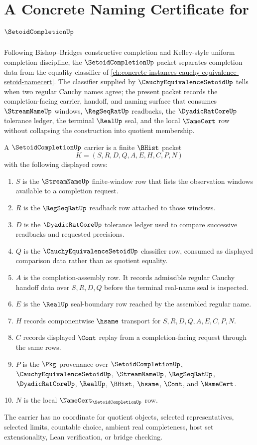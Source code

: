 \chapter{A Concrete Naming Certificate for $\SetoidCompletionUp$}
\label{ch:concrete-instances-setoid-completion-namecert}

Following Bishop--Bridges constructive completion and Kelley-style uniform completion discipline, the $\SetoidCompletionUp$ packet separates completion data from the equality classifier of \autoref{ch:concrete-instances-cauchy-equivalence-setoid-namecert}. The classifier supplied by $\CauchyEquivalenceSetoidUp$ tells when two regular Cauchy names agree; the present packet records the completion-facing carrier, handoff, and naming surface that consumes $\StreamNameUp$ windows, $\RegSeqRatUp$ readbacks, the $\DyadicRatCoreUp$ tolerance ledger, the terminal $\RealUp$ seal, and the local $\NameCert$ row without collapsing the construction into quotient membership.

\begin{definition}
\label{def:setoid-completion-carrier}
A $\SetoidCompletionUp$ carrier is a finite $\BHist$ packet
$$
K=(S,R,D,Q,A,E,H,C,P,N)
$$
with the following displayed rows:
\begin{enumerate}
\item $S$ is the $\StreamNameUp$ finite-window row that lists the observation windows available to a completion request.
\item $R$ is the $\RegSeqRatUp$ readback row attached to those windows.
\item $D$ is the $\DyadicRatCoreUp$ tolerance ledger used to compare successive readbacks and requested precisions.
\item $Q$ is the $\CauchyEquivalenceSetoidUp$ classifier row, consumed as displayed comparison data rather than as quotient equality.
\item $A$ is the completion-assembly row. It records admissible regular Cauchy handoff data over $S,R,D,Q$ before the terminal real-name seal is inspected.
\item $E$ is the $\RealUp$ seal-boundary row reached by the assembled regular name.
\item $H$ records componentwise $\hsame$ transport for $S,R,D,Q,A,E,C,P,N$.
\item $C$ records displayed $\Cont$ replay from a completion-facing request through the same rows.
\item $P$ is the $\Pkg$ provenance over $\SetoidCompletionUp$, $\CauchyEquivalenceSetoidUp$, $\StreamNameUp$, $\RegSeqRatUp$, $\DyadicRatCoreUp$, $\RealUp$, $\BHist$, $\hsame$, $\Cont$, and $\NameCert$.
\item $N$ is the local $\NameCert_{\SetoidCompletionUp}$ row.
\end{enumerate}
The carrier has no coordinate for quotient objects, selected representatives, selected limits, countable choice, ambient real completeness, host set extensionality, Lean verification, or bridge checking.
\end{definition}

